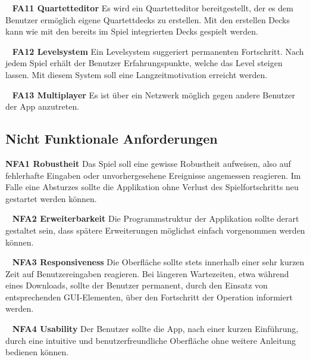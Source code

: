 \documentclass{scrartcl}
\begin{document}
\ \newline
\textbf{FA11 Quartetteditor} \newline
Es wird ein Quartetteditor bereitgestellt, der es dem Benutzer ermöglich
eigene Quartettdecks zu erstellen. Mit den erstellen Decks kann wie mit den
bereits im Spiel integrierten Decks gespielt werden.

\ \newline
\textbf{FA12 Levelsystem} \newline
Ein Levelsystem suggeriert permanenten Fortschritt. Nach jedem Spiel erhält der
Benutzer Erfahrungspunkte, welche das Level steigen lassen. Mit diesem System
soll eine Langzeitmotivation erreicht werden.

\ \newline
\textbf{FA13 Multiplayer} \newline
Es ist über ein Netzwerk möglich gegen andere Benutzer der App anzutreten.

\subsection{Nicht Funktionale Anforderungen}

\textbf{NFA1 Robustheit} \newline
Das Spiel soll eine gewisse Robustheit aufweisen, also auf fehlerhafte Eingaben
oder unvorhergesehene Ereignisse angemessen reagieren. Im Falle eine Absturzes
sollte die Applikation ohne Verlust des Spielfortschritts neu gestartet werden
können.

\ \newline
\textbf{NFA2 Erweiterbarkeit} \newline
Die Programmstruktur der Applikation sollte derart gestaltet sein, dass
spätere Erweiterungen möglichst einfach vorgenommen werden können.

\newpage
\ \newline
\textbf{NFA3 Responsiveness} \newline
Die Oberfläche sollte stets innerhalb einer sehr kurzen Zeit auf
Benutzereingaben reagieren. Bei längeren Wartezeiten, etwa während eines
Downloads, sollte der Benutzer permanent, durch den Einsatz von entsprechenden
GUI-Elementen, über den Fortschritt der Operation informiert werden.

\ \newline
\textbf{NFA4 Usability} \newline
Der Benutzer sollte die App, nach einer kurzen Einführung, durch eine intuitive
und benutzerfreundliche Oberfläche ohne weitere Anleitung bedienen können.
\end{document}
